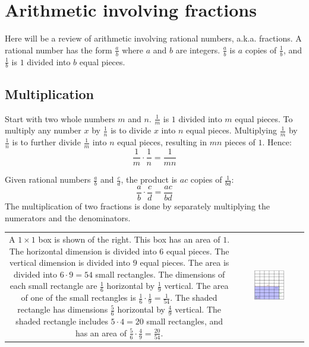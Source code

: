 \documentclass{article}
\begin{document}
\section{Arithmetic involving fractions}

Here will be a review of arithmetic involving rational numbers, a.k.a. fractions. A rational number has the form \(\frac{a}{b}\) where \(a\) and \(b\) are integers. \(\frac{a}{b}\) is \(a\) copies of \(\frac{1}{b}\), and \(\frac{1}{b}\) is \(1\) divided into \(b\) equal pieces.


\subsection{Multiplication}

Start with two whole numbers \(m\) and \(n\). \(\frac{1}{m}\) is \(1\) divided into \(m\) equal pieces. To multiply any number \(x\) by \(\frac{1}{n}\) is to divide \(x\) into \(n\) equal pieces. Multiplying \(\frac{1}{m}\) by \(\frac{1}{n}\) is to further divide \(\frac{1}{m}\) into \(n\) equal pieces, resulting in \(mn\) pieces of \(1\). Hence:
\[\frac{1}{m} \cdot \frac{1}{n} = \frac{1}{mn}\]

Given rational numbers \(\frac{a}{b}\) and \(\frac{c}{d}\), the product is \(ac\) copies of \(\frac{1}{bd}\):
\[\frac{a}{b} \cdot \frac{c}{d} = \frac{ac}{bd}\] 
The multiplication of two fractions is done by separately multiplying the numerators and the denominators.


\begin{tabular}{cc}
\parbox{0.5\textwidth}{
A \(1 \times 1\) box is shown of the right. This box has an area of \(1\). The horizontal dimension is divided into \(6\) equal pieces. The vertical dimension is divided into \(9\) equal pieces. The area is divided into \(6 \cdot 9 = 54\) small rectangles. The dimensions of each small rectangle are \(\frac{1}{6}\) horizontal by \(\frac{1}{9}\) vertical. The area of one of the small rectangles is \(\frac{1}{6} \cdot \frac{1}{9} = \frac{1}{54}\). The shaded rectangle has dimensions \(\frac{5}{6}\) horizontal by \(\frac{4}{9}\) vertical. The shaded rectangle includes \(5 \cdot 4 = 20\) small rectangles, and has an area of \(\frac{5}{6} \cdot \frac{4}{9} = \frac{20}{54}\).
} & \parbox{0.5\textwidth}{
\includegraphics[width = 0.5\textwidth]{multiplying_fractions}
}
\end{tabular}
\end{document}
